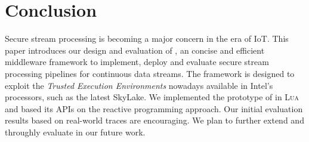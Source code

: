 \section{Conclusion}
\label{sec:conclusion}
Secure stream processing is becoming a major concern in the era of IoT.
This paper introduces our design and evaluation of \SYS{}, an concise and efficient middleware framework to implement, deploy and evaluate secure stream processing pipelines for continuous data streams.
The framework is designed to exploit the \emph{Trusted Execution Environments} nowadays available in Intel's processors, such as the latest SkyLake.
We implemented the prototype of \SYS{} in \textsc{Lua} and based its APIs on the reactive programming approach.
Our initial evaluation results based on real-world traces are encouraging.
We plan to further extend and throughly evaluate \SYS in our future work.

